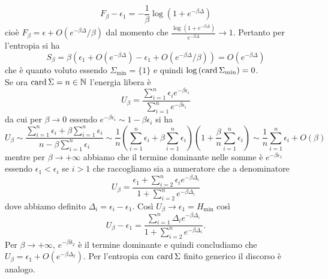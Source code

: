 \begin{solution}
    \[
        F_\beta - \epsilon_1 = - \frac{1}{\beta} \log{(1+e^{-\beta\Delta})}
    \]
    cioè $ F_\beta = \epsilon + O(e^{-\beta\Delta}/\beta) $ dal momento che $ \frac{\log{(1+e^{-\beta\Delta})}}{e^{-\beta\Delta}} \to 1 $. Pertanto per l'entropia si ha
    \[
        S_\beta = \beta(\epsilon_1 + O(e^{-\beta\Delta}) - \epsilon_1 + O(e^{-\beta\Delta}/\beta)) = O(e^{-\beta\Delta})
    \]
    che è quanto voluto essendo $ \Sigma_\mathrm{min} = \{1\} $ e quindi $ \log{(\operatorname{card}{\Sigma_\mathrm{min}})} = 0 $. \\
    Se ora $ \operatorname{card}{\Sigma} = n \in \mathbb{N} $ l'energia libera è
    \[
        U_\beta = \frac{\sum_{i=1}^{n} \epsilon_i e^{-\beta\epsilon_i}}{\sum_{i=1}^{n}e^{-\beta\epsilon_i}}
    \]
    da cui per $ \beta \to 0 $ essendo $ e^{-\beta\epsilon_i} \sim 1 - \beta\epsilon_i $ si ha
    \[
        U_\beta \sim \frac{\sum_{i=1}^{n} \epsilon_i + \beta \sum_{i=1}^{n} \epsilon_i}{n -\beta \sum_{i=1}^{n} \epsilon_i} \sim \frac{1}{n} \left(\sum_{i=1}^{n}\epsilon_i + \beta \sum_{i=1}^{n} \epsilon_i\right)\left(1 + \frac{\beta}{n}\sum_{i=1}^{n} \epsilon_i\right) \sim \frac{1}{n} \sum_{i=1}^{n}\epsilon_i + O(\beta)
    \]
    mentre per $ \beta \to +\infty $ abbiamo che il termine dominante nelle somme è $ e^{-\beta\epsilon_1} $ essendo $ \epsilon_1 < \epsilon_i $ se $ i > 1 $ che raccogliamo sia a numeratore che a denominatore
    \[
        U_\beta = \frac{\epsilon_1 + \sum_{i=2}^{n}\epsilon_i e^{-\beta\Delta_i}}{1 + \sum_{i=2}^{n}e^{-\beta\Delta_i}}
    \]
    dove abbiamo definito $ \Delta_i = \epsilon_i - \epsilon_1 $. Così $ U_\beta \to \epsilon_1 = H_{\mathrm{min}} $ così
    \[
        U_\beta - \epsilon_1 = \frac{\sum_{i=1}^{n} \Delta_i e^{-\beta\Delta_i}}{1+\sum_{i=2}^{n}e^{-\beta\Delta_i}}.
    \]
    Per $ \beta \to +\infty $, $ e^{-\beta\delta_2} $ è il termine dominante e  quindi concludiamo che $ U_\beta = \epsilon_1 + O(e^{-\beta\Delta_2}) $. Per l'entropia con $ \operatorname{card}{\Sigma} $ finito generico il discorso è analogo.
\end{solution}
